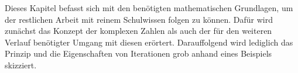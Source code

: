
Dieses Kapitel befasst sich mit den ben\"otigten mathematischen Grundlagen, um
der restlichen Arbeit mit reinem Schulwissen folgen zu k\"onnen.
Daf\"ur wird zun\"achst das Konzept der komplexen Zahlen als auch der f\"ur den weiteren
Verlauf ben\"otigter Umgang mit diesen er\"ortert.
Darauffolgend wird lediglich das Prinzip und die Eigenschaften von Iterationen grob
anhand eines Beispiels skizziert.


